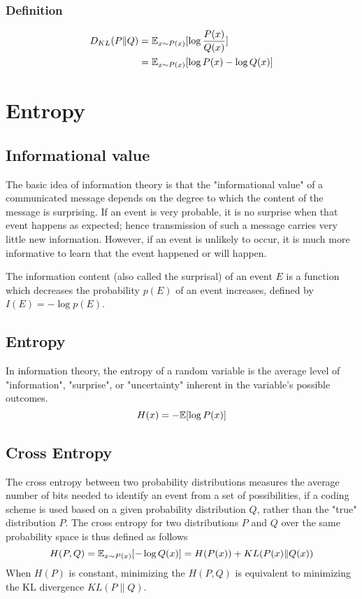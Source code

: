 \subsubsection{Definition}
\begin{equation}
    \begin{split}
        D_{KL}(P\|Q)
        &= \mathbb{E}_{x \sim P(x)}[\log \frac{P(x)}{Q(x)}] \\
        &= \mathbb{E}_{x \sim P(x)} [\log P(x) - \log Q(x)]
    \end{split}
\end{equation}

\section{Entropy}
\subsection{Informational value}
The basic idea of information theory is that the "informational value" of a communicated message depends on the
degree to which the content of the message is surprising. If an event is very probable, it is no surprise
when that event happens as expected; hence transmission of such a message carries very little new information.
However, if an event is unlikely to occur, it is much more informative to learn that the event happened or will happen.

The information content (also called the surprisal) of an event $E$ is a function which decreases the probability $p(E)$
of an event increases, defined by $I(E) = - \log p(E)$.

\subsection{Entropy}

In information theory, the entropy of a random variable is the average level of "information", "surprise", or "uncertainty" inherent in the variable's possible outcomes.
\begin{equation}
    H(x) = -\mathbb{E}[\log P(x)]
\end{equation}

\subsection{Cross Entropy}
The cross entropy between two probability distributions measures the average number of bits needed to identify an
event from a set of possibilities, if a coding scheme is used based on a given probability distribution $Q$, rather
than the "true" distribution $P$. The cross entropy for two distributions $P$ and $Q$ over the same probability
space is thus defined as follows
\begin{equation}
    H(P, Q) = \mathbb{E}_{x \sim P(x)}[- \log Q(x)] = H(P(x)) + KL(P(x)\|Q(x))
\end{equation}
When $H(P)$ is constant, minimizing the $H(P, Q)$ is equivalent to minimizing the KL divergence $KL(P\|Q)$.

